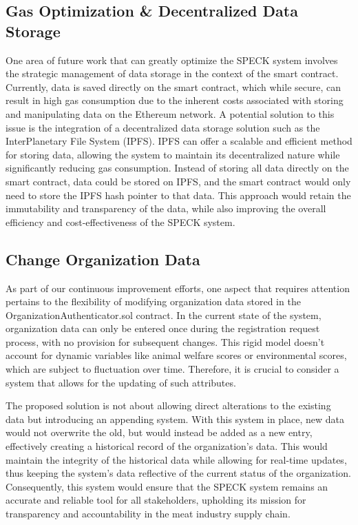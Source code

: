 \documentclass[oneside,a4paper,12pt, colorinlistoftodos]{article} %
\begin{document}
\subsection{Gas Optimization \& Decentralized Data Storage}
One area of future work that can greatly optimize the SPECK system involves the strategic management of data storage in the context of the smart contract. Currently, data is saved directly on the smart contract, which while secure, can result in high gas consumption due to the inherent costs associated with storing and manipulating data on the Ethereum network. A potential solution to this issue is the integration of a decentralized data storage solution such as the InterPlanetary File System (IPFS). IPFS can offer a scalable and efficient method for storing data, allowing the system to maintain its decentralized nature while significantly reducing gas consumption. Instead of storing all data directly on the smart contract, data could be stored on IPFS, and the smart contract would only need to store the IPFS hash pointer to that data. This approach would retain the immutability and transparency of the data, while also improving the overall efficiency and cost-effectiveness of the SPECK system.

\subsection{Change Organization Data}
As part of our continuous improvement efforts, one aspect that requires attention pertains to the flexibility of modifying organization data stored in the OrganizationAuthenticator.sol contract. In the current state of the system, organization data can only be entered once during the registration request process, with no provision for subsequent changes. This rigid model doesn't account for dynamic variables like animal welfare scores or environmental scores, which are subject to fluctuation over time. Therefore, it is crucial to consider a system that allows for the updating of such attributes.

The proposed solution is not about allowing direct alterations to the existing data but introducing an appending system. With this system in place, new data would not overwrite the old, but would instead be added as a new entry, effectively creating a historical record of the organization's data. This would maintain the integrity of the historical data while allowing for real-time updates, thus keeping the system's data reflective of the current status of the organization. Consequently, this system would ensure that the SPECK system remains an accurate and reliable tool for all stakeholders, upholding its mission for transparency and accountability in the meat industry supply chain.
\end{document}
